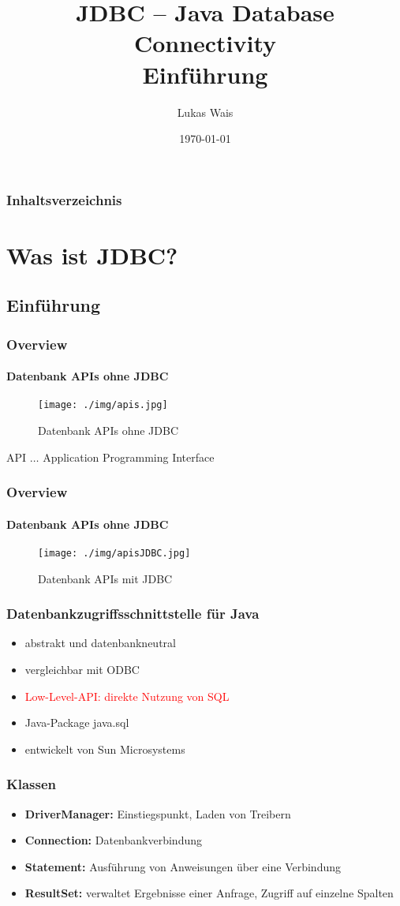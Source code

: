 \documentclass[class=beamer, crop=false]{standalone}
\title{JDBC – Java Database Connectivity \\ Einführung}
\author{Lukas Wais}
\institute{Codersbay}
\date{\today}
\begin{document}
\frame{\titlepage}

\begin{frame}
	\frametitle{Inhaltsverzeichnis}
	\tableofcontents
\end{frame}

\section{Was ist JDBC?}
\subsection{Einführung}

\begin{frame}
	\frametitle{Overview}
	\framesubtitle{Datenbank APIs ohne JDBC}
	\begin{center}
	\begin{figure}
  		\texttt{[image: ./img/apis.jpg]}
  		\caption{Datenbank APIs ohne JDBC}
  		\label{Datenbank APIs ohne JDBC}
	\end{figure}
	\end{center}
	API $\ldots$ Application Programming Interface
\end{frame}

\begin{frame}
	\frametitle{Overview}
	\framesubtitle{Datenbank APIs ohne JDBC}
	\begin{center}
	\begin{figure}
  		\texttt{[image: ./img/apisJDBC.jpg]}
  		\caption{Datenbank APIs mit JDBC}
  		\label{Datenbank APIs mit JDBC}
	\end{figure}
	\end{center}
\end{frame}

\begin{frame}
	\frametitle{Datenbankzugriffsschnittstelle für Java}
	\begin{itemize}
		\item abstrakt und datenbankneutral
		\item vergleichbar mit ODBC
		\item \textcolor{red}{Low-Level-API: direkte Nutzung von SQL}
		\item Java-Package java.sql
		\item entwickelt von Sun Microsystems
	\end{itemize}
\end{frame}

\begin{frame}
	\frametitle{Klassen}
	\begin{itemize}
		\item \textbf{DriverManager:} Einstiegspunkt, Laden von Treibern
		\item \textbf{Connection:} Datenbankverbindung
		\item \textbf{Statement:} Ausführung von Anweisungen über eine Verbindung
		\item \textbf{ResultSet:} verwaltet Ergebnisse einer Anfrage, Zugriff auf einzelne Spalten
	\end{itemize}
\end{frame}
\end{document}
